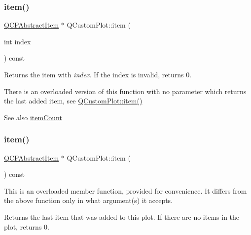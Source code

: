 \mbox{\label{class_q_custom_plot_ac042f2e78edd228ccf2f26b7fe215239}} 
\subsubsection{\texorpdfstring{item()}{item()}\hspace{0.1cm}{\footnotesize\ttfamily [1/2]}}
{\footnotesize\ttfamily \mbox{\hyperlink{class_q_c_p_abstract_item}{Q\+C\+P\+Abstract\+Item}} $\ast$ Q\+Custom\+Plot\+::item (\begin{DoxyParamCaption}\item[{int}]{index }\end{DoxyParamCaption}) const}

Returns the item with {\itshape index}. If the index is invalid, returns 0.

There is an overloaded version of this function with no parameter which returns the last added item, see \mbox{\hyperlink{class_q_custom_plot_ac042f2e78edd228ccf2f26b7fe215239}{Q\+Custom\+Plot\+::item()}}

\begin{DoxySeeAlso}{See also}
\mbox{\hyperlink{class_q_custom_plot_a16025daf0341f9362be3080e404424c2}{item\+Count}} 
\end{DoxySeeAlso}
\mbox{\label{class_q_custom_plot_a12eb2a283cf10a8a9176c01c0443e83e}} 
\subsubsection{\texorpdfstring{item()}{item()}\hspace{0.1cm}{\footnotesize\ttfamily [2/2]}}
{\footnotesize\ttfamily \mbox{\hyperlink{class_q_c_p_abstract_item}{Q\+C\+P\+Abstract\+Item}} $\ast$ Q\+Custom\+Plot\+::item (\begin{DoxyParamCaption}{ }\end{DoxyParamCaption}) const}

This is an overloaded member function, provided for convenience. It differs from the above function only in what argument(s) it accepts.

Returns the last item that was added to this plot. If there are no items in the plot, returns 0.

